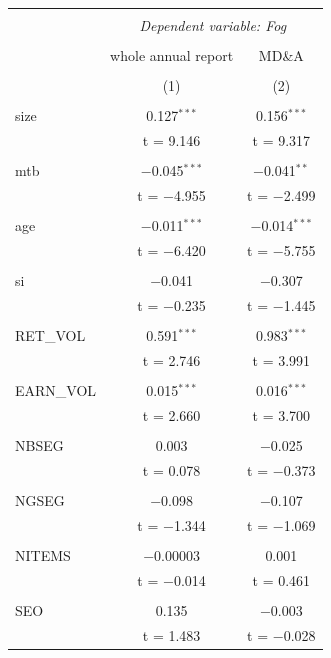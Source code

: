 \documentclass[a4paper]{article}
\begin{document}
\begin{center}
\begin{longtable}{@{\extracolsep{5pt}}lcc}
\\[-1.8ex]\hline 
\hline \\[-1.8ex] 
 & \multicolumn{2}{c}{\textit{Dependent variable: Fog}} \\ 
\cline{2-3} 
\\[-1.8ex] &whole annual report&MD\&A \\ 
\\[-1.8ex] & (1) & (2)\\ 
\hline \\[-1.8ex] 
 size & 0.127$^{***}$ & 0.156$^{***}$ \\ 
  & t = 9.146 & t = 9.317 \\ 
  & & \\ 
 mtb & $-$0.045$^{***}$ & $-$0.041$^{**}$ \\ 
  & t = $-$4.955 & t = $-$2.499 \\ 
  & & \\ 
 age & $-$0.011$^{***}$ & $-$0.014$^{***}$ \\ 
  & t = $-$6.420 & t = $-$5.755 \\ 
   & & \\ 
 si & $-$0.041 & $-$0.307 \\ 
  & t = $-$0.235 & t = $-$1.445 \\ 
  & & \\ 
 RET\_VOL & 0.591$^{***}$ & 0.983$^{***}$ \\ 
  & t = 2.746 & t = 3.991 \\ 
  & & \\ 
 EARN\_VOL & 0.015$^{***}$ & 0.016$^{***}$ \\ 
  & t = 2.660 & t = 3.700 \\ 
  & & \\ 
 NBSEG & 0.003 & $-$0.025 \\ 
  & t = 0.078 & t = $-$0.373 \\ 
  & & \\ 
 NGSEG & $-$0.098 & $-$0.107 \\ 
  & t = $-$1.344 & t = $-$1.069 \\ 
  & & \\ 
 NITEMS & $-$0.00003 & 0.001 \\ 
  & t = $-$0.014 & t = 0.461 \\ 
  & & \\ 
 SEO & 0.135 & $-$0.003 \\ 
  & t = 1.483 & t = $-$0.028 \\ 

\end{longtable}
\end{center}
\end{document}
